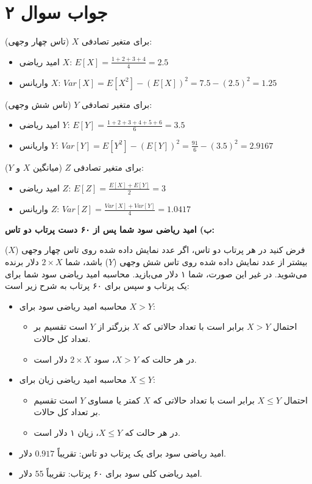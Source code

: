 \section*{جواب سوال ۲}

برای متغیر تصادفی \(X\) (تاس چهار وجهی):
\begin{itemize}
	\item امید ریاضی \(X\): \(E[X] = \frac{1 + 2 + 3 + 4}{4} = 2.5\)
	\item واریانس \(X\): \(Var[X] = E[X^2] - (E[X])^2 = 7.5 - (2.5)^2 = 1.25\)
\end{itemize}

برای متغیر تصادفی \(Y\) (تاس شش وجهی):
\begin{itemize}
	\item امید ریاضی \(Y\): \(E[Y] = \frac{1 + 2 + 3 + 4 + 5 + 6}{6} = 3.5\)
	\item واریانس \(Y\): \(Var[Y] = E[Y^2] - (E[Y])^2 = \frac{91}{6} - (3.5)^2 = 2.9167\)
\end{itemize}

برای متغیر تصادفی \(Z\) (میانگین \(X\) و \(Y\)):
\begin{itemize}
	\item امید ریاضی \(Z\): \(E[Z] = \frac{E[X] + E[Y]}{2} = 3\)
	\item واریانس \(Z\): \(Var[Z] = \frac{Var[X] + Var[Y]}{4} = 1.0417\)
\end{itemize}

\textbf{ب) امید ریاضی سود شما پس از ۶۰ دست پرتاب دو تاس:}

فرض کنید در هر پرتاب دو تاس، اگر عدد نمایش داده شده روی تاس چهار وجهی (\(X\)) بیشتر از عدد نمایش داده شده روی تاس شش وجهی (\(Y\)) باشد، شما \(2 \times X\) دلار برنده می‌شوید. در غیر این صورت، شما ۱ دلار می‌بازید. محاسبه امید ریاضی سود شما برای یک پرتاب و سپس برای ۶۰ پرتاب به شرح زیر است:

\begin{itemize}
	\item محاسبه امید ریاضی سود برای \(X > Y\):
	\begin{itemize}
		\item احتمال \(X > Y\) برابر است با تعداد حالاتی که \(X\) بزرگتر از \(Y\) است تقسیم بر تعداد کل حالات.
		\item در هر حالت که \(X > Y\)، سود \(2 \times X\) دلار است.
	\end{itemize}
	\item محاسبه امید ریاضی زیان برای \(X \leq Y\):
	\begin{itemize}
		\item احتمال \(X \leq Y\) برابر است با تعداد حالاتی که \(X\) کمتر یا مساوی \(Y\) است تقسیم بر تعداد کل حالات.
		\item در هر حالت که \(X \leq Y\)، زیان ۱ دلار است.
	\end{itemize}
	\item امید ریاضی سود برای یک پرتاب دو تاس: تقریباً \(0.917\) دلار.
	\item امید ریاضی کلی سود برای ۶۰ پرتاب: تقریباً \(55\) دلار.
\end{itemize}
